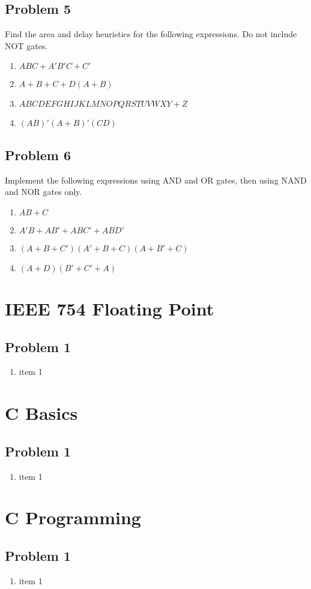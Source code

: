 \documentclass{article}
\begin{document}
\subsection*{Problem 5}
Find the area and delay heuristics for the following expressions. Do not include NOT gates.  
\begin{enumerate}[label=\alph*.]
    \item $ABC + A'B'C + C'$
    \item $A + B + C + D(A + B)$
    \item $ABCDEFGHIJKLMNOPQRSTUVWXY + Z$
    \item $(AB)'(A+B)'(CD)$
\end{enumerate}

\subsection*{Problem 6}
Implement the following expressions using AND and OR gates, then using NAND and NOR gates only. 
\begin{enumerate}[label=\alph*.]
    \item $AB + C$
    \item $A'B + AB' + ABC' + ABD'$
    \item $(A+B+C')(A'+B+C)(A+B'+C)$
    \item $(A+D)(B'+C'+A)$
\end{enumerate}


\newpage
\section*{IEEE 754 Floating Point}
\subsection*{Problem 1}
\begin{enumerate}[label=\alph*.]
    \item item 1
\end{enumerate}

\section*{C Basics} 
\subsection*{Problem 1}
\begin{enumerate}[label=\alph*.]
    \item item 1
\end{enumerate}

\section*{C Programming}
\subsection*{Problem 1}
\begin{enumerate}[label=\alph*.]
    \item item 1
\end{enumerate}
\end{document}
